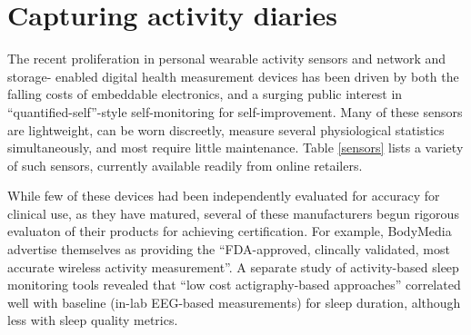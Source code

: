 \documentclass{chi-ext}
\begin{document}
\section{Capturing activity diaries}

The recent proliferation in personal wearable activity sensors and
network and storage- enabled digital health measurement devices has
been driven by both the falling costs of embeddable electronics, and a
surging public interest in ``quantified-self''-style self-monitoring
for self-improvement.  Many of these sensors are lightweight,
can be worn discreetly, measure several physiological statistics
simultaneously, and most require little maintenance. Table
\ref{sensors} lists a variety of such sensors, currently available
readily from online retailers.

\newpage

\vspace{6cm}


While few of these devices had been independently evaluated for
accuracy for clinical use, as they have matured, several of these
manufacturers begun rigorous evaluaton of their products for achieving
certification. For example, BodyMedia advertise themselves as
providing the ``FDA-approved, clincally validated, most accurate
wireless activity measurement''.  A separate study of activity-based
sleep monitoring tools revealed that ``low cost actigraphy-based
approaches'' correlated well with baseline (in-lab EEG-based
measurements) for sleep duration, although less with sleep quality
metrics.
\end{document}

